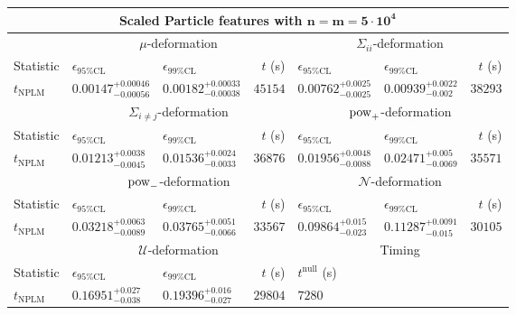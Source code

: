 \begin{tabular}{l|llr|llr}
	\toprule
	\multicolumn{7}{c}{{\bf Scaled Particle features with $\mathbf{n=m=5\cdot 10^{4}}$}} \\
	\toprule
	\multicolumn{1}{c}{} & \multicolumn{3}{c}{$\mu$-deformation} & \multicolumn{3}{c}{$\Sigma_{ii}$-deformation} \\
	Statistic & $\epsilon_{95\%\mathrm{CL}}$ & $\epsilon_{99\%\mathrm{CL}}$ & $t$ (s) & $\epsilon_{95\%\mathrm{CL}}$ & $\epsilon_{99\%\mathrm{CL}}$ & $t$ (s) \\
	\midrule
	$t_{\mathrm{NPLM}}$ & $0.00147_{-0.00056}^{+0.00046}$ & $0.00182_{-0.00038}^{+0.00033}$ & $45154$ & $0.00762_{-0.0025}^{+0.0025}$ & $0.00939_{-0.002}^{+0.0022}$ & $38293$ \\
	\toprule
	\multicolumn{1}{c}{} & \multicolumn{3}{c}{$\Sigma_{i\neq j}$-deformation} & \multicolumn{3}{c}{$\rm{pow}_{+}$-deformation} \\
	Statistic & $\epsilon_{95\%\mathrm{CL}}$ & $\epsilon_{99\%\mathrm{CL}}$ & $t$ (s) & $\epsilon_{95\%\mathrm{CL}}$ & $\epsilon_{99\%\mathrm{CL}}$ & $t$ (s) \\
	\midrule
	$t_{\mathrm{NPLM}}$ & $0.01213_{-0.0045}^{+0.0038}$ & $0.01536_{-0.0033}^{+0.0024}$ & $36876$ & $0.01956_{-0.0088}^{+0.0048}$ & $0.02471_{-0.0069}^{+0.005}$ & $35571$ \\
	\toprule
	\multicolumn{1}{c}{} & \multicolumn{3}{c}{$\rm{pow}_{-}$-deformation} & \multicolumn{3}{c}{$\mathcal{N}$-deformation} \\
	Statistic & $\epsilon_{95\%\mathrm{CL}}$ & $\epsilon_{99\%\mathrm{CL}}$ & $t$ (s) & $\epsilon_{95\%\mathrm{CL}}$ & $\epsilon_{99\%\mathrm{CL}}$ & $t$ (s) \\
	\midrule
	$t_{\mathrm{NPLM}}$ & $0.03218_{-0.0089}^{+0.0063}$ & $0.03765_{-0.0066}^{+0.0051}$ & $33567$ & $0.09864_{-0.023}^{+0.015}$ & $0.11287_{-0.015}^{+0.0091}$ & $30105$ \\
	\toprule
	\multicolumn{1}{c}{} & \multicolumn{3}{c}{$\mathcal{U}$-deformation} & \multicolumn{3}{c}{Timing} \\
	Statistic & $\epsilon_{95\%\mathrm{CL}}$ & $\epsilon_{99\%\mathrm{CL}}$ & $t$ (s) & $t^{\mathrm{null}}$ (s) \\
	\midrule
	$t_{\mathrm{NPLM}}$ & $0.16951_{-0.038}^{+0.027}$ & $0.19396_{-0.027}^{+0.016}$ & $29804$ & $7280$ \\
	\bottomrule
\end{tabular}